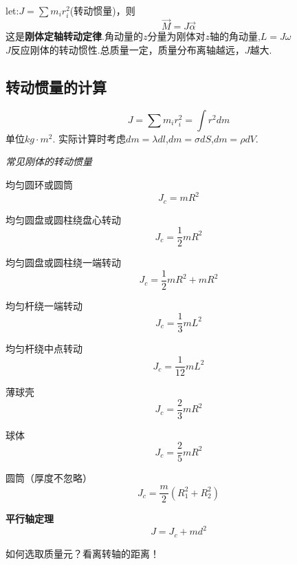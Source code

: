\documentclass[10pt,a4paper]{article}
\begin{document}
let:$J=\sum m_ir_i^2$(转动惯量)，则
\[\boxed{\vec{M}=J\vec{\alpha}}\]这是\textbf{刚体定轴转动定律}.角动量的$z$分量为刚体对$z$轴的角动量,$\boxed{L=J\omega}$
\\$J$反应刚体的转动惯性.总质量一定，质量分布离轴越远，$J$越大.
\subsection{转动惯量的计算}
\[\boxed{J=\sum m_ir_i^2=\int r^2dm}\]单位$kg\cdot m^2$.
实际计算时考虑$dm=\lambda dl$,$dm=\sigma dS$,$dm=\rho dV$.

\textit{常见刚体的转动惯量}

均匀圆环或圆筒
\[J_c=mR^2\]

均匀圆盘或圆柱绕盘心转动
\[J_c=\frac{1}{2}mR^2\]

均匀圆盘或圆柱绕一端转动
\[J_c=\frac{1}{2}mR^2+mR^2\]

均匀杆绕一端转动
\[J_c=\frac{1}{3}mL^2\]

均匀杆绕中点转动
\[J_c=\frac{1}{12}mL^2\]

薄球壳
\[J_c=\frac{2}{3}mR^2\]

球体
\[J_c=\frac{2}{5}mR^2\]

圆筒（厚度不忽略）
\[J_c=\frac{m}{2}(R_1^2+R_2^2)\]

\textbf{平行轴定理}
\[\boxed{J=J_c+md^2}\]

如何选取质量元？看离转轴的距离！
\end{document}
